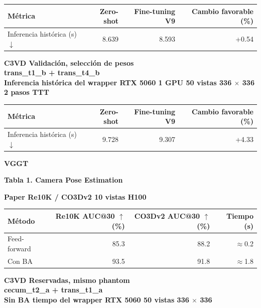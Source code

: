 \documentclass[10pt,a4paper]{article}
\begin{document}
\begingroup\small
\begin{tabularx}{\textwidth}{@{}LRRR@{}}
\toprule
\textbf{Métrica} & \textbf{Zero-shot} & \textbf{Fine-tuning V9} & \textbf{Cambio favorable (\%)} \\
\midrule
Inferencia histórica (s) \(\downarrow\) & 8.639 & 8.593 & +0.54 \\
\bottomrule
\end{tabularx}
\endgroup
\vspace{6mm}
{\small\bfseries C3VD \textperiodcentered{} Validación, selección de pesos\\trans\_t1\_b + trans\_t4\_b\\Inferencia histórica del wrapper \textperiodcentered{} RTX 5060 \textperiodcentered{} 1 GPU \textperiodcentered{} 50 vistas \textperiodcentered{} 336 \(\times\) 336 \textperiodcentered{} 2 pasos TTT}\par
\vspace{2mm}
\begingroup\small
\begin{tabularx}{\textwidth}{@{}LRRR@{}}
\toprule
\textbf{Métrica} & \textbf{Zero-shot} & \textbf{Fine-tuning V9} & \textbf{Cambio favorable (\%)} \\
\midrule
Inferencia histórica (s) \(\downarrow\) & 9.728 & 9.307 & +4.33 \\
\bottomrule
\end{tabularx}
\endgroup
\vspace{6mm}
\clearpage
{\Large\bfseries\color{header} VGGT}\par
\vspace{5mm}
{\large\bfseries Tabla 1. Camera Pose Estimation}\par
\vspace{4mm}
{\small\bfseries Paper \textperiodcentered{} Re10K / CO3Dv2 \textperiodcentered{} 10 vistas \textperiodcentered{} H100}\par
\vspace{2mm}
\begingroup\small
\begin{tabularx}{\textwidth}{@{}LRRR@{}}
\toprule
\textbf{Método} & \textbf{Re10K AUC@30 \(\uparrow\) (\%)} & \textbf{CO3Dv2 AUC@30 \(\uparrow\) (\%)} & \textbf{Tiempo (s)} \\
\midrule
Feed-forward & 85.3 & 88.2 & \(\approx\)0.2 \\
Con BA & 93.5 & 91.8 & \(\approx\)1.8 \\
\bottomrule
\end{tabularx}
\endgroup
\vspace{6mm}
{\small\bfseries C3VD \textperiodcentered{} Reservadas, mismo phantom\\cecum\_t2\_a + trans\_t1\_a\\Sin BA \textperiodcentered{} tiempo del wrapper \textperiodcentered{} RTX 5060 \textperiodcentered{} 50 vistas \textperiodcentered{} 336 \(\times\) 336}\par
\end{document}
